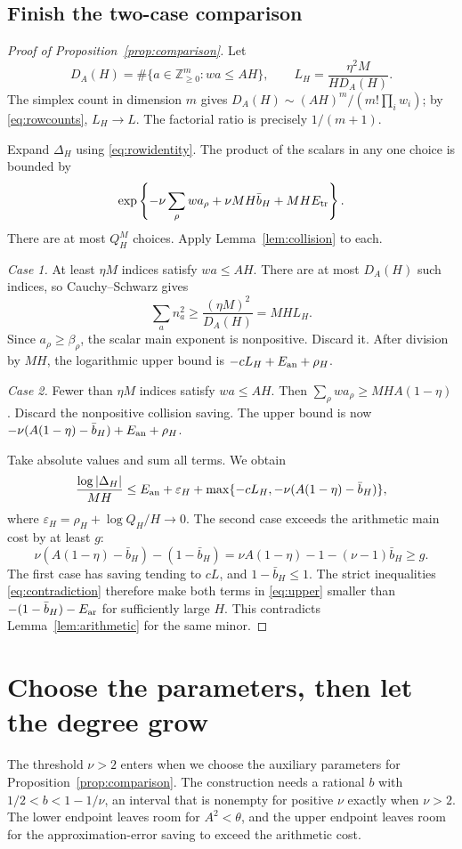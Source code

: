 \documentclass[11pt]{article}
\theoremstyle{definition}
\theoremstyle{remark}
\newcommand{\N}{\mathbb Z_{\ge0}}
\numberwithin{equation}{section}
\begin{document}
\subsection{Finish the two-case comparison}
\begin{proof}[Proof of Proposition~\ref{prop:comparison}]
Let
\[
 D_A(H)=\#\{a\in\N^m:wa\le AH\},\qquad
 L_H=\frac{\eta^2M}{H D_A(H)}.
\]
The simplex count in dimension \(m\) gives
\(D_A(H)\sim(AH)^m/(m!\prod_iw_i)\); by \eqref{eq:rowcounts},
\(L_H\to L\). The factorial ratio is precisely \(1/(m+1)\).

Expand \(\Delta_H\) using \eqref{eq:rowidentity}. The product of
the scalars in any one choice is bounded by
\[
 \exp\left\{-\nu\sum_\rho wa_\rho+\nu MH\bar b_H+MH E_{\rm tr}\right\}.
\]
There are at most \(Q_H^M\) choices. Apply
Lemma~\ref{lem:collision} to each.

\emph{Case 1.} At least \(\eta M\) indices satisfy \(wa\le AH\).
There are at most \(D_A(H)\) such indices, so Cauchy--Schwarz gives
\[
 \sum_a n_a^2\ge\frac{(\eta M)^2}{D_A(H)}=MH L_H.
\]
Since \(a_\rho\ge\beta_\rho\), the scalar main exponent is
nonpositive. Discard it. After division by \(MH\), the logarithmic
upper bound is \(-cL_H+E_{\rm an}+\rho_H\).

\emph{Case 2.} Fewer than \(\eta M\) indices satisfy \(wa\le AH\).
Then \(\sum_\rho wa_\rho\ge MH A(1-\eta)\). Discard the
nonpositive collision saving. The upper bound is now
\(-\nu(A(1-\eta)-\bar b_H)+E_{\rm an}+\rho_H\).

Take absolute values and sum all terms. We obtain
\begin{equation}\label{eq:upper}
 \frac{\log|\Delta_H|}{MH}
 \le E_{\rm an}+\varepsilon_H+
 \max\{-cL_H,-\nu(A(1-\eta)-\bar b_H)\},
\end{equation}
where \(\varepsilon_H=\rho_H+\log Q_H/H\to0\).
The second case exceeds the arithmetic main cost by at least \(g\):
\[
 \nu(A(1-\eta)-\bar b_H)-(1-\bar b_H)
 =\nu A(1-\eta)-1-(\nu-1)\bar b_H\ge g.
\]
The first case has saving tending to \(cL\), and \(1-\bar b_H\le1\).
The strict inequalities \eqref{eq:contradiction} therefore make both
terms in \eqref{eq:upper} smaller than
\(-(1-\bar b_H)-E_{\rm ar}\) for sufficiently large \(H\).
This contradicts Lemma~\ref{lem:arithmetic} for the same minor.
\end{proof}

\section{Choose the parameters, then let the degree grow}\label{sec:parameters}
The threshold \(\nu>2\) enters when we choose the auxiliary parameters
for Proposition~\ref{prop:comparison}. The construction needs a rational
\(b\) with \(1/2<b<1-1/\nu\), an interval that is nonempty for positive
\(\nu\) exactly when \(\nu>2\). The lower endpoint leaves room for
\(A^2<\theta\), and the upper endpoint leaves room for the
approximation-error saving to exceed the arithmetic cost.
\end{document}
